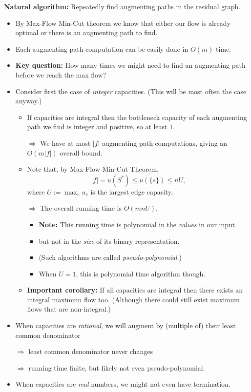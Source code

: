 \documentclass{article}
\begin{document}
\textbf{Natural algorithm:} Repeatedly find augmenting paths in the residual graph. 
\begin{itemize}
	\item By Max-Flow Min-Cut theorem we know that either our flow is already optimal or there is an augmenting path to find.
	\item Each augmenting path computation can be easily done in $O(m)$ time.
	\item \textbf{Key question:} How many times we might need to find an augmenting path before we reach the max flow?
	\item Consider first the case of {\em integer} capacities. (This will be most often the case anyway.)
	\begin{itemize}
		\item If capacities are integral then the bottleneck capacity of each augmenting path we find is integer and positive, so at least $1$.
		
		$\Rightarrow$ We have at most $|f|$ augmenting path computations, giving an $O(m|f|)$ overall bound. 
		
		\item Note that, by Max-Flow Min-Cut Theorem, 
		\[
		|f|=u(S^*)\leq u(\{s\})\leq nU,
		\]
		where $U:=\max_e u_e$ is the largest edge capacity. 
		
		$\Rightarrow$ The overall running time is $O(mnU)$.
                \begin{itemize}
                  \item \textbf{Note:} This running time is polynomial in the {\em values} in our input
                \item but not in the {\em size} of its binary representation.
                \item (Such algorithms are called {\em pseudo-polynomial}.)
                  \item When $U=1$, this is polynomial time algorithm though.
                \end{itemize}
		\item \textbf{Important corollary:} If all capacities are integral then there exists an integral maximum flow too. (Although there could still exist maximum flows that are non-integral.)
	\end{itemize}
      \item When capacities are {\em rational}, we will augment by (multiple of) their least common denominator
        
        $\Rightarrow$ least common denominator never changes
        
	$\Rightarrow$ running time finite, but likely not even pseudo-polynomial. 
	\item When capacities are {\em real} numbers, we might not even have termination.
\end{itemize}
\end{document}
